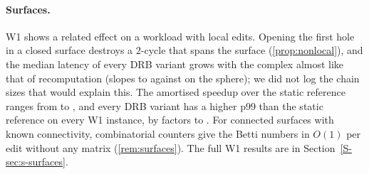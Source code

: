 \paragraph{Surfaces.}
W1 shows a related effect on a workload with local edits. Opening the first
hole in a closed surface destroys a $2$-cycle that spans the surface
(\cref{prop:nonlocal}), and the median latency of every DRB variant grows with
the complex almost like that of recomputation (slopes
\NumSlopeEFiveWOneSphereMmhmNorbMed{} to \NumSlopeEFiveWOneSphereDrbIdRbMed{}
against \NumSlopeEFiveWOneSphereFullIdMed{} on the sphere); we did not log the
chain sizes that would explain this. The amortised speedup over the static
reference ranges from \NumMainWOneSpeedupMin{} to \NumMainWOneSpeedupMax, and
every DRB variant has a higher p99 than the static reference on every W1
instance, by factors \NumMainWOneProbNinetyNineRatioMin{} to
\NumMainWOneProbNinetyNineRatioMax. For connected surfaces with known
connectivity, combinatorial counters give the Betti numbers in $O(1)$ per edit
without any matrix (\cref{rem:surfaces}). The full W1 results are in
Section~\ref{S-sec:s-surfaces}.
